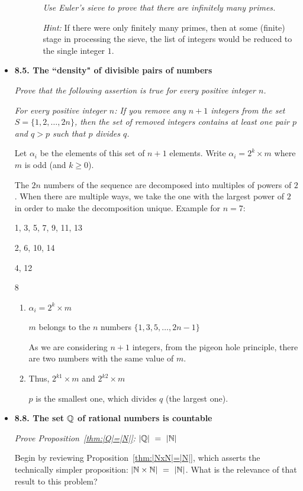 \begin{itemize}
\begin{itemize}
\begin{enumerate}
\bigskip

{\em Use Euler's sieve to prove that there are infinitely many primes.}
\medskip

{\em Hint:} If there were only finitely many primes, then at some (finite) stage in processing the sieve, the list of integers would be reduced to the single integer $1$.
\end{enumerate}
\end{itemize}

 \medskip\item

{\bf 8.5. The ``density"  of divisible pairs of numbers}

{\em Prove that the following assertion is true for every positive integer $n$.}
\medskip

{\em 
For every positive integer $n$:  If you remove {\em any} $n+1$ integers from the set $S = \{ 1, 2, \ldots, 2n\}$, then the set of removed integers contains at least one pair $p$ and $q > p$ such that $p$ divides $q$.
}
\medskip

Let $\alpha_i$ be the elements of this set of $n+1$ elements.
Write $\alpha_i = 2^k \times m$ where $m$ is odd (and $k \geq 0$).

The $2n$ numbers of the sequence are decomposed into multiples of powers of $2$.
When there are multiple ways, we take the one with the largest power of $2$ in order to make the decomposition unique.
Example for $n=7$:

1, 3, 5, 7, 9, 11, 13

2, 6, 10, 14

4, 12

8
\medskip


\begin{enumerate}
\item
 $\alpha_i = 2^k \times m$ 
 
$m$ belongs to the $n$ numbers $\{1,3,5, \ldots, 2n-1 \}$

As we are considering $n+1$ integers, from the pigeon hole principle, there are two numbers with the same value of $m$. 
\item 
Thus, $2^{k1} \times m$ and $2^{k2} \times m$

$p$ is the smallest one, which divides $q$ (the largest one).
\end{enumerate}


\medskip\item

{\bf 8.8. The set $\mathbb{Q}$ of rational numbers is countable}

{\em Prove Proposition~\ref{thm:|Q|=|N|}: $|\mathbb{Q}| \ = \ |\mathbb{N}|$}

\smallskip

Begin by reviewing Proposition~\ref{thm:|NxN|=|N|}, which asserts the technically simpler proposition: $|\mathbb{N} \times \mathbb{N}| \ = \ |\mathbb{N}|$.  What is the relevance of that result to this problem?

\end{itemize}



